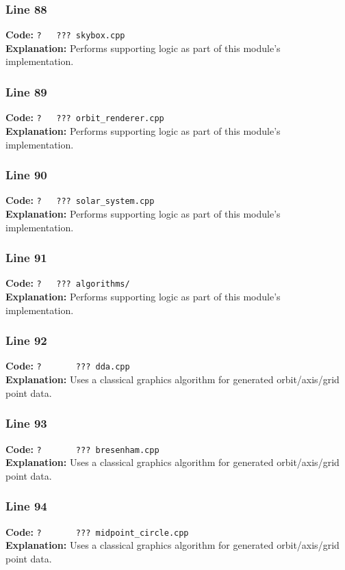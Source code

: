 \documentclass[11pt,a4paper]{article}
\begin{document}
\subsubsection*{Line 88}
\textbf{Code:} \verb|?   ??? skybox.cpp|\\
\textbf{Explanation:} Performs supporting logic as part of this module's implementation.

\subsubsection*{Line 89}
\textbf{Code:} \verb|?   ??? orbit_renderer.cpp|\\
\textbf{Explanation:} Performs supporting logic as part of this module's implementation.

\subsubsection*{Line 90}
\textbf{Code:} \verb|?   ??? solar_system.cpp|\\
\textbf{Explanation:} Performs supporting logic as part of this module's implementation.

\subsubsection*{Line 91}
\textbf{Code:} \verb|?   ??? algorithms/|\\
\textbf{Explanation:} Performs supporting logic as part of this module's implementation.

\subsubsection*{Line 92}
\textbf{Code:} \verb|?       ??? dda.cpp|\\
\textbf{Explanation:} Uses a classical graphics algorithm for generated orbit/axis/grid point data.

\subsubsection*{Line 93}
\textbf{Code:} \verb|?       ??? bresenham.cpp|\\
\textbf{Explanation:} Uses a classical graphics algorithm for generated orbit/axis/grid point data.

\subsubsection*{Line 94}
\textbf{Code:} \verb|?       ??? midpoint_circle.cpp|\\
\textbf{Explanation:} Uses a classical graphics algorithm for generated orbit/axis/grid point data.
\end{document}
